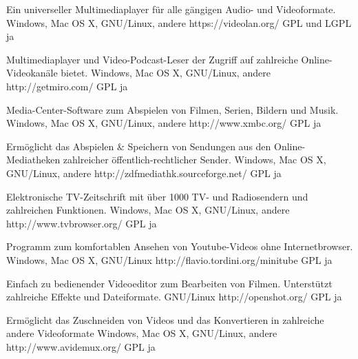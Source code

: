 \documentclass[11pt,a4paper,landscape,twocolumn]{article}
\begin{document}


{Ein universeller Multimediaplayer für alle gängigen Audio- und Videoformate.}
{Windows, Mac OS X, GNU/Linux, andere}
{https://videolan.org/}
{GPL und LGPL}
{ja}

{Multimediaplayer und Video-Podcast-Leser der Zugriff auf zahlreiche Online-Videokanäle bietet.}
{Windows, Mac OS X, GNU/Linux, andere}
{http://getmiro.com/}
{GPL}
{ja}

{Media-Center-Software zum Abspielen von Filmen, Serien, Bildern und Musik.}
{Windows, Mac OS X, GNU/Linux, andere}
{http://www.xmbc.org/}
{GPL}
{ja}

{Ermöglicht das Abspielen \& Speichern von Sendungen aus den Online-Mediatheken zahlreicher öffentlich-rechtlicher Sender.}
{Windows, Mac OS X, GNU/Linux, andere}
{http://zdfmediathk.sourceforge.net/}
{GPL}
{ja}


\newpage %


{Elektronische TV-Zeitschrift mit über 1000 TV- und Radiosendern und zahlreichen Funktionen.}
{Windows, Mac OS X, GNU/Linux, andere}
{http://www.tvbrowser.org/}
{GPL}
{ja}

{Programm zum komfortablen Ansehen von Youtube-Videos ohne Internetbrowser.}
{Windows, Mac OS X, GNU/Linux}
{http://flavio.tordini.org/minitube}
{GPL}
{ja}

{Einfach zu bedienender Videoeditor zum Bearbeiten von Filmen. Unterstützt zahlreiche Effekte und Dateiformate.}
{GNU/Linux}
{http://openshot.org/}
{GPL}
{ja}

{Ermöglicht das Zuschneiden von Videos und das Konvertieren in zahlreiche andere Videoformate}
{Windows, Mac OS X, GNU/Linux, andere}
{http://www.avidemux.org/}
{GPL}
{ja}
\end{document}
